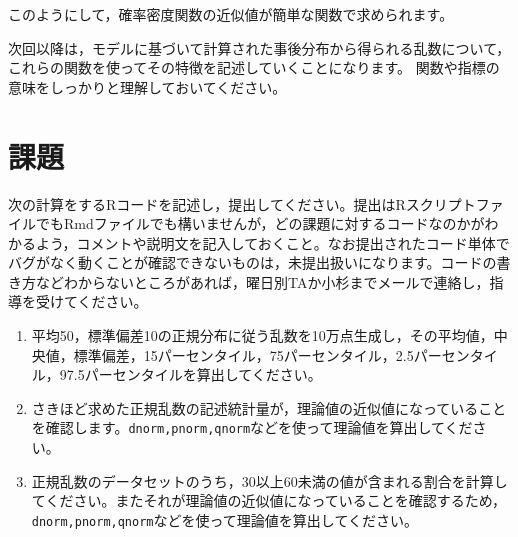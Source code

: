 \documentclass{ltjsbook}
\begin{document}
このようにして，確率密度関数の近似値が簡単な関数で求められます。

次回以降は，モデルに基づいて計算された事後分布から得られる乱数について，これらの関数を使ってその特徴を記述していくことになります。
関数や指標の意味をしっかりと理解しておいてください。
\section{課題}
次の計算をするRコードを記述し，提出してください。提出はRスクリプトファイルでもRmdファイルでも構いませんが，どの課題に対するコードなのかがわかるよう，コメントや説明文を記入しておくこと。なお提出されたコード単体でバグがなく動くことが確認できないものは，未提出扱いになります。コードの書き方などわからないところがあれば，曜日別TAか小杉までメールで連絡し，指導を受けてください。
\begin{enumerate}
	\item 平均50，標準偏差10の正規分布に従う乱数を10万点生成し，その平均値，中央値，標準偏差，15パーセンタイル，75パーセンタイル，2.5パーセンタイル，97.5パーセンタイルを算出してください。
	\item さきほど求めた正規乱数の記述統計量が，理論値の近似値になっていることを確認します。\texttt{dnorm,pnorm,qnorm}などを使って理論値を算出してください。
	\item 正規乱数のデータセットのうち，30以上60未満の値が含まれる割合を計算してください。またそれが理論値の近似値になっていることを確認するため，\texttt{dnorm,pnorm,qnorm}などを使って理論値を算出してください。
\end{enumerate}
\end{document}
